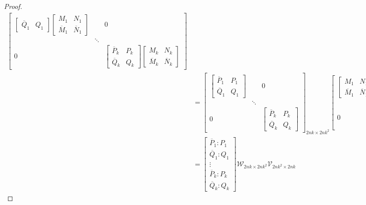 \documentclass[10pt,reqno,oneside,a4paper]{article}
\begin{document}
\begin{proof}
\begin{align*}
\begin{bmatrix}
\begin{bmatrix}
\overline{Q}_1 & Q_1 
\end{bmatrix} 
\begin{bmatrix}
M_1 & N_1  \\
\overline{M}_1 & \overline{N}_1 
\end{bmatrix} & & 0 \\
 & \ddots & \\
0 & & \begin{bmatrix}
\overline{P}_k & P_k \\
\overline{Q}_k & Q_k 
\end{bmatrix} 
\begin{bmatrix}
M_k & N_k  \\
\overline{M}_k & \overline{N}_k 
\end{bmatrix}
\end{bmatrix} \\
&= 
\begin{bmatrix}
\begin{bmatrix}
\overline{P}_1 & P_1 \\
\overline{Q}_1 & Q_1 
\end{bmatrix} 
 & & 0 \\
 & \ddots & \\
0 & & \begin{bmatrix}
\overline{P}_k & P_k \\
\overline{Q}_k & Q_k 
\end{bmatrix} 
\end{bmatrix}_{2nk \times 2nk^2}
\begin{bmatrix}
\begin{bmatrix}
M_1 & N_1  \\
\overline{M}_1 & \overline{N}_1 
\end{bmatrix} & & 0 \\
 & \ddots & \\
0 & & 
\begin{bmatrix}
M_k & N_k  \\
\overline{M}_k & \overline{N}_k 
\end{bmatrix}
\end{bmatrix}_{2nk^2 \times 2nk} \\
&= 
\begin{bmatrix}
\overline{P}_1 : P_1 \\
\overline{Q}_1 : Q_1 \\
\vdots \\
\overline{P}_k : P_k \\
\overline{Q}_k : Q_k 
\end{bmatrix}
\mathcal{W}_{2nk \times 2nk^2}
\mathcal{V}_{2nk^2 \times 2nk}

\end{align*}
\end{proof}
\end{document}
